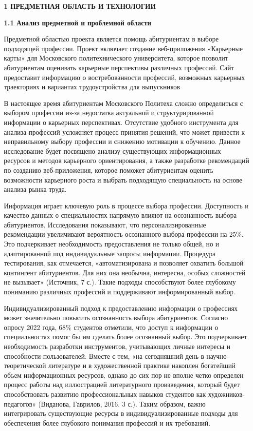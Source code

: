 \newpage
\begin{center}
    \textbf{\large 1 ПРЕДМЕТНАЯ ОБЛАСТЬ И ТЕХНОЛОГИИ}
\end{center}

\textbf{1.1 Анализ предметной и проблемной области}

Предметной областью проекта является помощь абитуриентам в выборе подходящей профессии. 
Проект включает создание веб-приложения «Карьерные карты» для Московского политехнического университета, которое позволит 
абитуриентам оценивать карьерные перспективы различных профессий. Сайт предоставит информацию о востребованности профессий, 
возможных карьерных траекториях и вариантах трудоустройства для выпускников

В настоящее время абитуриентам Московского Политеха сложно определиться с выбором профессии из-за недостатка актуальной и 
структурированной информации о карьерных перспективах. Отсутствие удобного инструмента для анализа профессий усложняет процесс 
принятия решений, что может привести к неправильному выбору профессии и снижению мотивации к обучению.
Данное исследование будет посвящено анализу существующих информационных ресурсов и методов карьерного ориентирования, а также 
разработке рекомендаций по созданию веб-приложения, которое поможет абитуриентам оценить возможности карьерного роста и выбрать 
подходящую специальность на основе анализа рынка труда.

Информация играет ключевую роль в процессе выбора профессии. 
Доступность и качество данных о специальностях напрямую влияют на осознанность выбора абитуриентов. 
Исследования показывают, что персонализированные рекомендации увеличивают вероятность осознанного выбора профессии на 25\%. 
Это подчеркивает необходимость предоставления не только общей, но и адаптированной под индивидуальные запросы информации. 
Процедура тестирования, как отмечается, «автоматизирована и позволяет охватить большой контингент абитуриентов. 
Для них она необычна, интересна, особых сложностей не вызывает» (Источник, 7 с.). 
Такие подходы способствуют более глубокому пониманию различных профессий и поддерживают информированный выбор.

Индивидуализированный подход к предоставлению информации о профессиях может значительно повысить осознанность выбора 
абитуриентов. Согласно опросу 2022 года, 68\% студентов отметили, что доступ к информации о специальностях помог бы им 
сделать более осознанный выбор. Это подчеркивает необходимость разработки инструментов, учитывающих личные интересы и 
способности пользователей. Вместе с тем, «на сегодняшний день в научно-теоретической литературе и в художественной практике 
накоплен богатейший объем информационных ресурсов, однако до сих пор не вполне четко определен процесс работы над иллюстрацией 
литературного произведения, который будет способствовать развитию профессиональных навыков студентов как художников-педагогов» 
(Виданова, Гаврилов, 2016. 3 с.). Таким образом, важно интегрировать существующие ресурсы в индивидуализированные подходы для 
обеспечения более глубокого понимания профессий и их требований.

